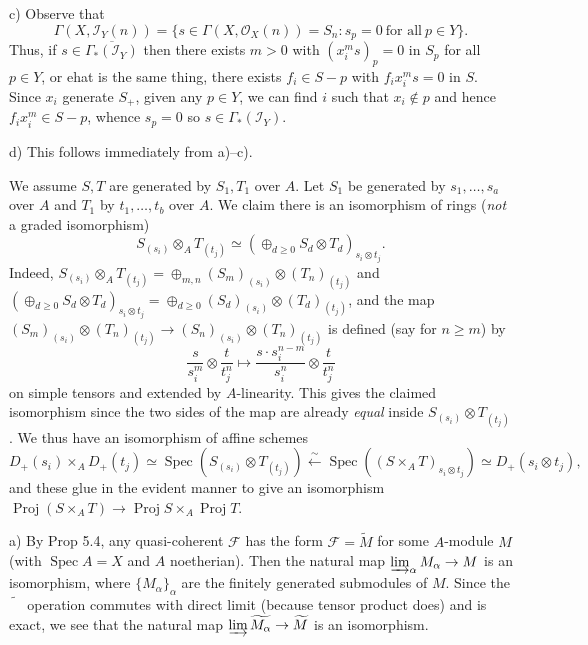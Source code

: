 \documentclass{report}
\newcommand{\I}{\mathscr{I}}
\newcommand{\F}{\mathcal{F}}
\renewcommand{\O}{\mathcal{O}}
\DeclareMathOperator{\Spec}{Spec}
\DeclareMathOperator{\Proj}{Proj}
\begin{document}
\noindent
c)	Observe that $$\Gamma(X,\I_Y(n))=\{s\in \Gamma(X,\O_X(n))=S_n : s_p=0\ \text{for all}\ p\in Y\}.$$
Thus, if $s\in \overline{\Gamma_*(\I_Y)}$ then there exists $m>0$ with $(x_i^m s)_p=0$ in $S_p$ for all
$p\in Y$, or ehat is the same thing, there exists $f_i\in S-p$ with $f_ix_i^m s =0$ in $S$.  Since $x_i$
generate $S_+$, given any $p\in Y$, we can find $i$ such that $x_i\not\in p$ and hence $f_i x_i^m \in S-p$,
whence $s_p=0$ so $s\in \Gamma_*(\I_Y)$.

\noindent
d)	This follows immediately from a)--c).

\bigskip
{}	We assume $S,T$ are generated by $S_1,T_1$ over $A$.
Let $S_1$ be generated by $s_1,\ldots,s_a$ over $A$ and $T_1$ by $t_1,\ldots,t_b$ over $A$.
We claim there is an isomorphism of rings ({\em not} a graded isomorphism)
$$S_{(s_i)}\otimes_A T_{(t_j)}\simeq \left(\oplus_{d\ge 0} S_d\otimes T_d\right)_{s_i\otimes t_j}.$$
Indeed, $S_{(s_i)}\otimes_A T_{(t_j)}=\oplus_{m,n} (S_m)_{(s_i)}\otimes (T_n)_{(t_j)}$
and $\left(\oplus_{d\ge 0} S_d\otimes T_d\right)_{s_i\otimes t_j}=\oplus_{d\ge 0} (S_d)_{(s_i)}\otimes (T_d)_{(t_j)}$,
and the map $(S_m)_{(s_i)}\otimes (T_n)_{(t_j)}\rightarrow (S_n)_{(s_i)}\otimes (T_n)_{(t_j)}$
is defined (say for $n\ge m$) by 
$$\frac{s}{s_i^m}\otimes \frac{t}{t_j^n}\mapsto \frac{s\cdot s_i^{n-m}}{s_i^n}\otimes \frac{t}{t_j^n}$$
on simple tensors and extended by $A$-linearity.  This gives the claimed isomorphism since
the two sides of the map are already {\em equal} inside $S_{(s_i)}\otimes T_{(t_j)}$.
We thus have an isomorphism of affine schemes
$$D_+(s_i)\times_A D_+(t_j)\simeq \Spec(S_{(s_i)}\otimes T_{(t_j)})\xleftarrow{\sim} \Spec ((S\times_A T)_{s_i\otimes t_j})\simeq D_+(s_i\otimes t_j),$$
and these glue in the evident manner to give an isomorphism $\Proj (S\times_A T)\rightarrow \Proj S \times_A \Proj T$.




\bigskip
{} a)	By Prop 5.4, any quasi-coherent $\F$ has the form $\F=\widetilde{M}$ for some $A$-module $M$ (with $\Spec A=X$ and
$A$ noetherian).	Then the natural map $\varinjlim_{\alpha} M_{\alpha}\rightarrow M$ is an isomorphism,
where $\{M_{\alpha}\}_{\alpha}$ are the finitely generated submodules of $M$.
Since the $\widetilde{\phantom{M}}$ operation commutes with direct limit (because tensor product does) and is exact, 
we see that the natural map $\varinjlim \widetilde{M_{\alpha}}\rightarrow \widetilde{M}$
is an isomorphism.
\end{document}
